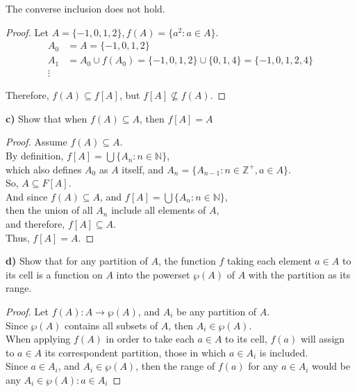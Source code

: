 \documentclass[titlepage, letterpaper, fleqn]{article}
\newcommand{\spacepls}{\vspace{5mm}}
\begin{document}
The converse inclusion does not hold.

\begin{proof}
Let \(A = \{-1, 0, 1, 2\}, f(A) = \{a^2 \colon a \in A\}\).
\begin{align*}
A_0 &= A = \{-1, 0, 1, 2\} \\
A_1 &= A_0 \cup f(A_0) = \{-1,0,1,2\} \cup \{0, 1, 4\} = \{-1, 0 ,1, 2 ,4\}\\
\vdots
\end{align*}

Therefore, \(f(A) \subseteq f[A]\), but \(f[A] \not \subseteq f(A)\).
\end{proof}

\spacepls

{\large \textbf{c)} Show that when \(f(A) \subseteq A\), then \(f[A] = A\)}

\begin{proof}
Assume \(f(A) \subseteq A\).\\
By definition, \(f[A] = \bigcup \{A_n \colon n \in \mathbb{N}\}\),\\
which also defines \(A_0\) as \(A\) itself, and \(A_n = \{A_{n-1} \colon n \in \mathbb{Z}^+, a \in A\}\).\\
So, \(A \subseteq F[A]\).\\
And since \(f(A) \subseteq A\), and \(f[A] = \bigcup \{A_n \colon n \in \mathbb{N}\}\),\\
then the union of all \(A_n\) include all elements of \(A\),\\
and therefore, \(f[A] \subseteq A\).\\
Thus, \(f[A] = A\).
\end{proof}

\spacepls

{\large \textbf{d)} Show that for any partition of \(A\), the function \(f\) taking each element \(a \in A\) to its cell is a function on \(A\) into the powerset \(\wp (A)\) of \(A\) with the partition as its range.}

\begin{proof}
Let \(f(A) \colon A \to \wp (A)\), and \(A_i\) be any partition of \(A\).\\
Since \(\wp (A)\) contains all subsets of \(A\), then \(A_i \in \wp (A)\).\\
When applying \(f(A)\) in order to take each \(a \in A\) to its cell,
\(f(a)\) will assign to \(a \in A\) its correspondent partition, those in which \(a \in A_i\) is included.\\
Since \(a \in A_i\), and \(A_i \in \wp (A)\), then the range of \(f(a)\) for any \(a \in A_i\) would be any \(A_i \in \wp (A) \colon a \in A_i\)
\end{proof}
\end{document}
